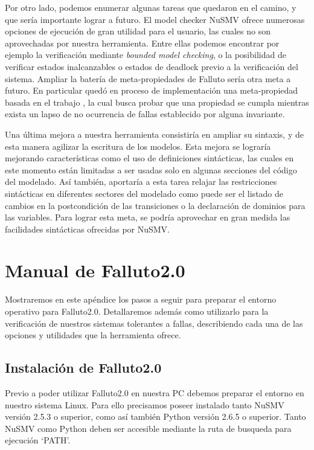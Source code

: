 \documentclass[pdftex,a4paper,12pt]{book}
\begin{document}
Por otro lado, podemos enumerar algunas tareas que quedaron en el camino, y que ser\'ia importante lograr a futuro. El model checker NuSMV ofrece numerosas opciones de ejecuci\'on de gran utilidad para el usuario, las cuales no son aprovechadas por nuestra herramienta. Entre ellas podemos encontrar por ejemplo la verificaci\'on mediante \textit{bounded model checking}, o la posibilidad de verificar estados inalcanzables o estados de deadlock previo a la verificaci\'on del sistema. Ampliar la bater\'ia de meta-propiedades de Falluto ser\'ia otra meta a futuro. En particular qued\'o en proceso de implementaci\'on una meta-propiedad basada en el trabajo \cite{dippolito}, la cual busca probar que una propiedad se cumpla mientras exista un lapso de no ocurrencia de fallas establecido por alguna invariante.

Una \'ultima mejora a nuestra herramienta consistir\'ia en ampliar su sintaxis, y de esta manera agilizar la escritura de los modelos. Esta mejora se lograr\'ia mejorando caracter\'isticas como el uso de definiciones sint\'acticas, las cuales en este momento est\'an limitadas a ser usadas solo en algunas secciones del c\'odigo del modelado. As\'i tambi\'en, aportar\'ia a esta tarea relajar las restricciones sint\'acticas en diferentes sectores del modelado como puede ser el listado de cambios en la postcondici\'on de las transiciones o la declaraci\'on de dominios para las variables. Para lograr esta meta, se podr\'ia aprovechar en gran medida las facilidades sint\'acticas ofrecidas por NuSMV.





\appendix
\appendixpage
\noappendicestocpagenum
\addappheadtotoc

\chapter{Manual de Falluto2.0}
Mostraremos en este ap\'endice los pasos a seguir para preparar el entorno operativo para Falluto2.0. Detallaremos adem\'as como utilizarlo para la verificaci\'on de nuestros sistemas tolerantes a fallas, describiendo cada una de las opciones y utilidades que la herramienta ofrece.

\section{Instalaci\'on de Falluto2.0}
Previo a poder utilizar Falluto2.0 en nuestra PC debemos preparar el entorno en nuestro sistema Linux. Para ello precisamos poseer instalado tanto NuSMV versi\'on 2.5.3 o superior, como as\'i tambi\'en Python versi\'on 2.6.5 o superior. Tanto NuSMV como Python deben ser accesible mediante la ruta de busqueda para ejecuci\'on `PATH'.
\end{document}
